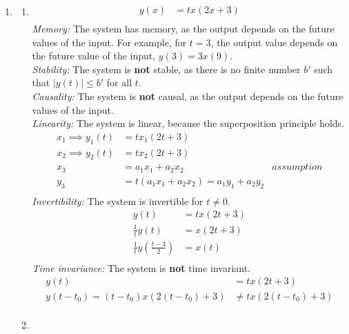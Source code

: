 \documentclass[10pt,a4paper, margin=1in]{article}
\begin{document}
\begin{enumerate}
\item %
    \begin{enumerate}
    \item %
        \begin{align*}
            y(x) & = tx(2x + 3) \\
        \end{align*}
        \textit{Memory: } The system has memory, as the output depends on the future values of the input.
        For example, for $t = 3$, the output value depends on the future value of the input, $y(3) = 3x(9)$.\\
        \textit{Stability: } The system is \textbf{not} stable, as there is no finite number $b'$ such that $|y(t)| \leq b'$ for all $t$.\\
        \textit{Causality: } The system is \textbf{not} causal, as the output depends on the future values of the input.\\
        \textit{Linearity: } The system is linear, because the superposition principle holds.\\
        \begin{align*}
            x_1 \implies y_1(t) & = tx_1(2t + 3) \\
            x_2 \implies y_2(t) & = tx_2(2t + 3) \\
            x_3 & = a_1x_1 + a_2x_2 & assumption\\
            y_3 & = t(a_1x_1 + a_2x_2) = a_1y_1 + a_2y_2 \\
        \end{align*}
        \textit{Invertibility: } The system is invertible for $t \neq 0$.
        \begin{align*}
            y(t) & = tx(2t + 3) \\
            \frac{1}{t}y(t) & = x(2t + 3) \\
            \frac{1}{t}y\left(\frac{t - 3}{2}\right) & = x(t) \\
        \end{align*}
        \textit{Time invariance: } The system is \textbf{not} time invariant.
        \begin{align*}
            y(t) & = tx(2t + 3) \\
            y(t - t_0) = (t-t_0)x(2(t - t_0) + 3) & \neq tx(2(t - t_0) + 3) \\
        \end{align*}
    \item %

\end{enumerate}
\end{enumerate}
\end{document}
